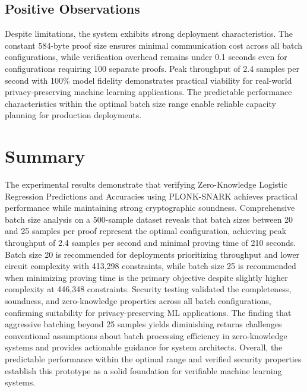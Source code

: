 \subsection{Positive Observations}

Despite limitations, the system exhibits strong deployment characteristics. The constant 584-byte proof size ensures minimal communication cost across all batch configurations, while verification overhead remains under 0.1 seconds even for configurations requiring 100 separate proofs. Peak throughput of 2.4 samples per second with 100\% model fidelity demonstrates practical viability for real-world privacy-preserving machine learning applications. The predictable performance characteristics within the optimal batch size range enable reliable capacity planning for production deployments.

\section{Summary}

The experimental results demonstrate that verifying Zero-Knowledge Logistic Regression Predictions and Accuracies using PLONK-SNARK achieves practical performance while maintaining strong cryptographic soundness. Comprehensive batch size analysis on a 500-sample dataset reveals that batch sizes between 20 and 25 samples per proof represent the optimal configuration, achieving peak throughput of 2.4 samples per second and minimal proving time of 210 seconds. Batch size 20 is recommended for deployments prioritizing throughput and lower circuit complexity with 413,298 constraints, while batch size 25 is recommended when minimizing proving time is the primary objective despite slightly higher complexity at 446,348 constraints. Security testing validated the completeness, soundness, and zero-knowledge properties across all batch configurations, confirming suitability for privacy-preserving ML applications. The finding that aggressive batching beyond 25 samples yields diminishing returns challenges conventional assumptions about batch processing efficiency in zero-knowledge systems and provides actionable guidance for system architects. Overall, the predictable performance within the optimal range and verified security properties establish this prototype as a solid foundation for verifiable machine learning systems.

